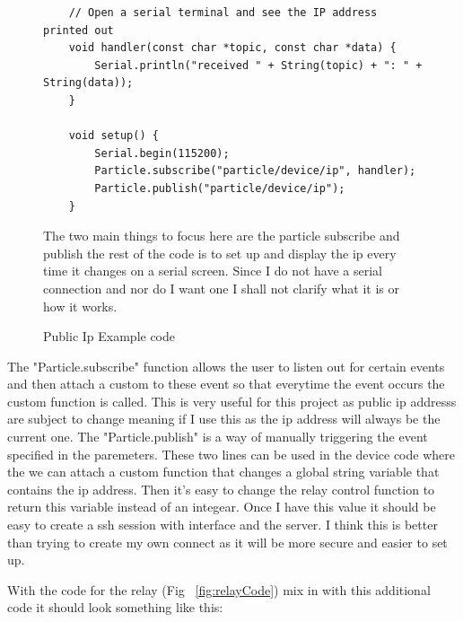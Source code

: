 \documentclass{article}
\begin{document}
\begin{figure}[H]
    \begin{lstlisting}
    // Open a serial terminal and see the IP address printed out
    void handler(const char *topic, const char *data) {
        Serial.println("received " + String(topic) + ": " + String(data));
    }

    void setup() {
        Serial.begin(115200);
        Particle.subscribe("particle/device/ip", handler);
        Particle.publish("particle/device/ip");
    }
    \end{lstlisting}
    \caption{Public Ip Example code} \label{fig:publicIpExample}
    The two main things to focus here are the particle subscribe and publish the rest of the
    code is to set up and display the ip every time it changes on a serial screen. Since
    I do not have a serial connection and nor do I want one I shall not clarify what it
    is or how it works.
\end{figure}

The "Particle.subscribe" function allows the user to listen out for certain events and then
attach a custom to these event so that everytime the event occurs the custom function is
called. This is very useful for this project as  public ip addresss are subject to change meaning
if I use this as the ip address will always be the current one. The "Particle.publish" is a way
of manually triggering the event specified in the paremeters. These two lines can be used
in the device code where the we can attach a custom function that changes a global string variable
that contains the ip address. Then it's easy to change the relay control function to return this
variable instead of an integear. Once I have this value it should be easy to create a ssh session
with interface and the server. I think this is better than trying to create my own connect as it
will be more secure and easier to set up.

With the code for the relay (Fig ~\ref{fig:relayCode}) mix in with this additional code it should look
something like this:
\end{document}
